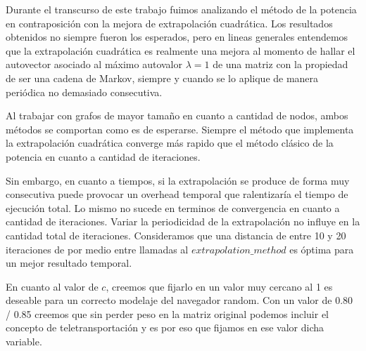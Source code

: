 Durante el transcurso de este trabajo fuimos analizando el m\'etodo de la potencia en contraposici\'on con la mejora de extrapolaci\'on cuadr\'atica. Los resultados obtenidos no siempre fueron los esperados, pero en lineas generales entendemos que la extrapolaci\'on cuadr\'atica es realmente una mejora al momento de hallar el autovector asociado al m\'aximo autovalor $\lambda = 1$ de una matriz con la propiedad de ser una cadena de Markov, siempre y cuando se lo aplique de manera peri\'odica no demasiado consecutiva.

Al trabajar con grafos de mayor tama\~no en cuanto a cantidad de nodos, ambos m\'etodos se comportan como es de esperarse. Siempre el m\'etodo que implementa la extrapolaci\'on cuadr\'atica converge m\'as rapido que el m\'etodo cl\'asico de la potencia en cuanto a cantidad de iteraciones.

Sin embargo, en cuanto a tiempos, si la extrapolaci\'on se produce de forma muy consecutiva puede provocar un overhead temporal que ralentizar\'ia el tiempo de ejecuci\'on total. Lo mismo no sucede en terminos de convergencia en cuanto a cantidad de iteraciones. Variar la periodicidad de la extrapolaci\'on no influye en la cantidad total de iteraciones. Consideramos que una distancia de entre 10 y 20 iteraciones de por medio entre llamadas al $extrapolation\_method$ es \'optima para un mejor resultado temporal.

En cuanto al valor de $c$, creemos que fijarlo en un valor muy cercano al 1 es deseable para un correcto modelaje del navegador random. Con un valor de 0.80 / 0.85 creemos que sin perder peso en la matriz original podemos incluir el concepto de teletransportaci\'on y es por eso que fijamos en ese valor dicha variable.

